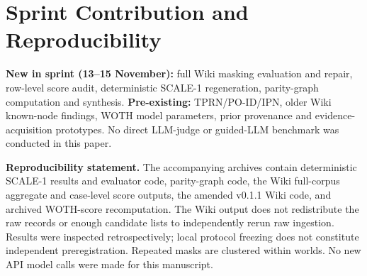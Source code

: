 \documentclass[10pt,twocolumn]{article}
\begin{document}
\section*{Sprint Contribution and Reproducibility}
\noindent\textbf{New in sprint (13--15 November):} full Wiki masking evaluation and repair, row-level score audit, deterministic SCALE-1 regeneration, parity-graph computation and synthesis. \textbf{Pre-existing:} TPRN/PO-ID/IPN, older Wiki known-node findings, WOTH model parameters, prior provenance and evidence-acquisition prototypes. No direct LLM-judge or guided-LLM benchmark was conducted in this paper.

\noindent\textbf{Reproducibility statement.}
The accompanying archives contain deterministic SCALE-1 results and evaluator code, parity-graph code, the Wiki full-corpus aggregate and case-level score outputs, the amended v0.1.1 Wiki code, and archived WOTH-score recomputation. The Wiki output does not redistribute the raw records or enough candidate lists to independently rerun raw ingestion. Results were inspected retrospectively; local protocol freezing does not constitute independent preregistration. Repeated masks are clustered within worlds. No new API model calls were made for this manuscript.
\end{document}
